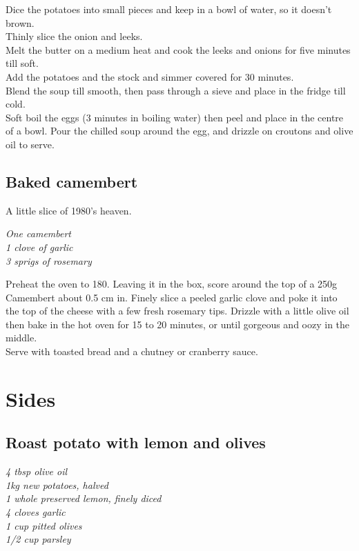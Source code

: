 \documentclass{tufte-book}
\begin{document}
\smallskip
Dice the potatoes into small pieces and keep in a bowl of water, so it doesn't brown.
\\Thinly slice the onion and leeks. 
\\Melt the butter on a medium heat and cook the leeks and onions for five minutes till soft.
\\Add the potatoes and the stock and simmer covered for 30 minutes.
\\Blend the soup till smooth, then pass through a sieve and place in the fridge till cold.
\\Soft boil the eggs (3 minutes in boiling water) then peel and place in the centre of a bowl. Pour the chilled soup around the egg, and drizzle on croutons and olive oil to serve.

\section{Baked camembert}

A little slice of 1980's heaven. 

\smallskip
\emph{One camembert
\\1 clove of garlic
\\3 sprigs of rosemary}

\smallskip
Preheat the oven to 180\celsius. Leaving it in the box, score around the top of a 250g Camembert about 0.5 cm in. Finely slice a peeled garlic clove and poke it into the top of the cheese with a few fresh rosemary tips. Drizzle with a little olive oil then bake in the hot oven for 15 to 20 minutes, or until gorgeous and oozy in the middle. 
\\Serve with toasted bread and a chutney or cranberry sauce.


\chapter{Sides}
\section{Roast potato with lemon and olives}

\smallskip
\emph{4 tbsp olive oil
\\1kg new potatoes, halved
\\1 whole preserved lemon, finely diced
\\4 cloves garlic
\\1 cup pitted olives
\\1/2 cup parsley
}
\smallskip
\end{document}
